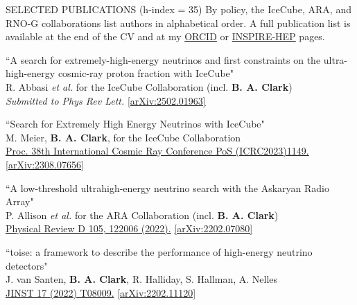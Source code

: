 \documentclass{resume} %
\begin{document}
\newpage
\begin{rSection}{SELECTED PUBLICATIONS (h-index = 35)}
  By policy, the IceCube, ARA, and RNO-G collaborations list authors in alphabetical order. A full publication list is available at the end of the CV and at my \href{https://orcid.org/0000-0003-4089-2245}{ORCID}  or  \href{https://inspirehep.net/author/profile/Brian.A.Clark.1}{INSPIRE-HEP} pages.

\begin{etaremune}%

  \item ``A search for extremely-high-energy neutrinos and first constraints on the ultra-high-energy cosmic-ray proton fraction with IceCube" \\
R. Abbasi {\it et al.} for the IceCube Collaboration (incl. \textbf{B. A. Clark})\\ \textit{Submitted to Phys Rev Lett.} \href{https://arxiv.org/abs/2502.01963}{[arXiv:2502.01963]}

  \item ``Search for Extremely High Energy Neutrinos with IceCube" \\
 M. Meier, \textbf{B. A. Clark}, for the IceCube Collaboration \\ \href{https://doi.org/10.22323/1.444.1149}{Proc. 38th International Cosmic Ray Conference PoS (ICRC2023)1149.}  \href{https://arxiv.org/abs/2308.07656}{[arXiv:2308.07656]}

  \item ``A low-threshold ultrahigh-energy neutrino search with the Askaryan Radio Array" \\
 P. Allison {\it et al.} for the ARA Collaboration (incl. \textbf{B. A. Clark})\\ \href{https://doi.org/10.1103/PhysRevD.105.122006}{Physical Review D 105, 122006 (2022).}  \href{https://arxiv.org/abs/2202.07080}{[arXiv:2202.07080]}


  \item ``toise: a framework to describe the performance of high-energy neutrino detectors" \\
 J. van Santen, \textbf{B. A. Clark}, R. Halliday, S. Hallman, A. Nelles \\  \href{https://doi.org/10.1088/1748-0221/17/08/T08009}{JINST 17 (2022) T08009.}  \href{https://arxiv.org/abs/2202.11120}{[arXiv:2202.11120]}



\end{etaremune}
\end{rSection}
\end{document}
